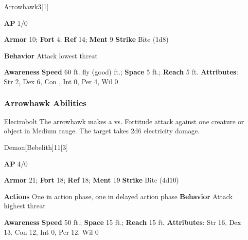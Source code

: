 \begin{monsection}{Arrowhawk}{3}[1]
\vspace{-1em}\vspace{-1em}
\begin{spellcontent}
\begin{spelltargetinginfo}
{\textbf{AP} 1/0}

\pari \textbf{Armor} 10;
\textbf{Fort} 4;
\textbf{Ref} 14;
\textbf{Ment} 9
\pari \textbf{Strike} Bite  (1d8)



\pari \textbf{Behavior} Attack lowest threat
\end{spelltargetinginfo}
\end{spellcontent}

\begin{monsterfooter}
\pari \textbf{Awareness} 
\pari \textbf{Speed} 60 ft. fly (good) ft.;
\textbf{Space} 5 ft.;
\textbf{Reach} 5 ft.
\pari \textbf{Attributes}:
Str 2,
Dex 6,
Con ,
Int 0,
Per 4,
Wil 0
\end{monsterfooter}
\end{monsection}


\subsubsection{Arrowhawk Abilities}

\begin{freeability}{Electrobolt}
The arrowhawk makes a  vs. Fortitude attack against one creature or object in Medium range.
\hit The target takes 2d6 electricity damage.
\end{freeability}

\begin{monsection}{Demon}[Bebelith]{11}[3]
\vspace{-1em}\vspace{-1em}
\begin{spellcontent}
\begin{spelltargetinginfo}
{\textbf{AP} 4/0}

\pari \textbf{Armor} 21;
\textbf{Fort} 18;
\textbf{Ref} 18;
\textbf{Ment} 19
\pari \textbf{Strike} Bite  (4d10)


\pari \textbf{Actions} One in action phase, one in delayed action phase
\pari \textbf{Behavior} Attack highest threat
\end{spelltargetinginfo}
\end{spellcontent}

\begin{monsterfooter}
\pari \textbf{Awareness} 
\pari \textbf{Speed} 50 ft.;
\textbf{Space} 15 ft.;
\textbf{Reach} 15 ft.
\pari \textbf{Attributes}:
Str 16,
Dex 13,
Con 12,
Int 0,
Per 12,
Wil 0
\end{monsterfooter}
\end{monsection}



